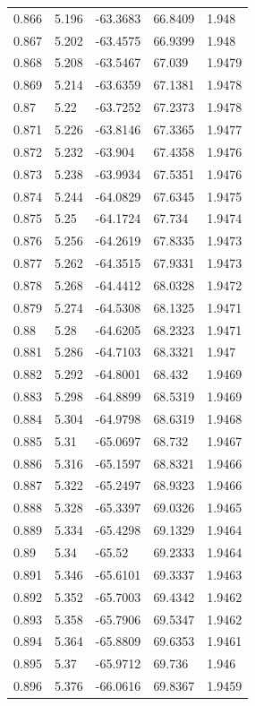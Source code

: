 \begin{tabular}{lllll}
0.866 & 5.196 & -63.3683 & 66.8409 & 1.948 \\
0.867 & 5.202 & -63.4575 & 66.9399 & 1.948 \\
0.868 & 5.208 & -63.5467 & 67.039 & 1.9479 \\
0.869 & 5.214 & -63.6359 & 67.1381 & 1.9478 \\
0.87 & 5.22 & -63.7252 & 67.2373 & 1.9478 \\
0.871 & 5.226 & -63.8146 & 67.3365 & 1.9477 \\
0.872 & 5.232 & -63.904 & 67.4358 & 1.9476 \\
0.873 & 5.238 & -63.9934 & 67.5351 & 1.9476 \\
0.874 & 5.244 & -64.0829 & 67.6345 & 1.9475 \\
0.875 & 5.25 & -64.1724 & 67.734 & 1.9474 \\
0.876 & 5.256 & -64.2619 & 67.8335 & 1.9473 \\
0.877 & 5.262 & -64.3515 & 67.9331 & 1.9473 \\
0.878 & 5.268 & -64.4412 & 68.0328 & 1.9472 \\
0.879 & 5.274 & -64.5308 & 68.1325 & 1.9471 \\
0.88 & 5.28 & -64.6205 & 68.2323 & 1.9471 \\
0.881 & 5.286 & -64.7103 & 68.3321 & 1.947 \\
0.882 & 5.292 & -64.8001 & 68.432 & 1.9469 \\
0.883 & 5.298 & -64.8899 & 68.5319 & 1.9469 \\
0.884 & 5.304 & -64.9798 & 68.6319 & 1.9468 \\
0.885 & 5.31 & -65.0697 & 68.732 & 1.9467 \\
0.886 & 5.316 & -65.1597 & 68.8321 & 1.9466 \\
0.887 & 5.322 & -65.2497 & 68.9323 & 1.9466 \\
0.888 & 5.328 & -65.3397 & 69.0326 & 1.9465 \\
0.889 & 5.334 & -65.4298 & 69.1329 & 1.9464 \\
0.89 & 5.34 & -65.52 & 69.2333 & 1.9464 \\
0.891 & 5.346 & -65.6101 & 69.3337 & 1.9463 \\
0.892 & 5.352 & -65.7003 & 69.4342 & 1.9462 \\
0.893 & 5.358 & -65.7906 & 69.5347 & 1.9462 \\
0.894 & 5.364 & -65.8809 & 69.6353 & 1.9461 \\
0.895 & 5.37 & -65.9712 & 69.736 & 1.946 \\
0.896 & 5.376 & -66.0616 & 69.8367 & 1.9459 \\

\end{tabular}
